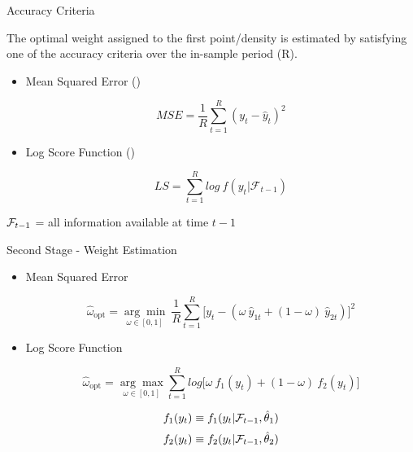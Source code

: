 \begin{frame}{Accuracy Criteria}

    The optimal weight assigned to the first point/density is estimated by satisfying one of the accuracy criteria over the in-sample period (R). 

    \begin{itemize}[<+->]
        \item Mean Squared Error (\cite{SW09})

        \begin{equation}
        \label{eqn:MSE1}
        MSE = \frac{1}{R} \sum^R_{t=1} (y_t - \hat y_t)^2
        \end{equation}  

        \item Log Score Function (\cite{GA11})

        \begin{equation}
        \label{eqn:LS1}
        LS = \sum^R_{t=1} log \ f(y_t| \mathcal{F}_{t-1})
        \end{equation}  
        
    \end{itemize}

      $\mathcal{F}_{\small{t-1}}$ = all information available at time $t-1$

\end{frame}



\begin{frame}{Second Stage - Weight Estimation}

    \begin{itemize}[<+->]
        \item Mean Squared Error

        \begin{equation}
        \label{eqn:MSE2}
        \hat{\omega}_{\text{opt}} = \underset{\omega \in [0,1]}{\arg\min} \ \frac{1}{R} \sum^R_{t=1} \Big[y_t - (\omega \ \hat y_{1t} + (1-\omega) \ \hat y_{2t})\Big]^2
        \end{equation}

        \item Log Score Function

        \begin{equation}
        \hat{\omega}_{\text{opt}} =  \underset{\omega \in [0,1]}{\arg\max} \sum^R_{t=1}log \Big[\omega \ f_1(y_t) + (1-\omega) \ f_2(y_t)\Big]
        \end{equation}

        \[f_1(y_t) \equiv f_1(y_t |\mathcal{F}_{\small{t-1}}, \hat\theta_1)\]
        \[f_2(y_t) \equiv f_2(y_t|\mathcal{F}_{\small{t-1}}, \hat\theta_2)\]
        
    \end{itemize}

\end{frame}



